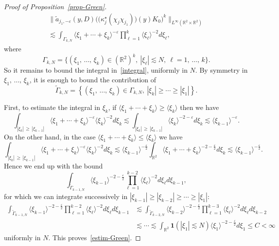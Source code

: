 \documentclass[10pt]{amsart}
\theoremstyle{definition}\newtheorem{defi}[theo]{Definition}\newtheorem{rema}[theo]{Remark}\newtheorem{exam}[theo]{Example}\newtheorem{exem}[theo]{Example}\newtheorem{nota}[theo]{Notation}
\newcommand{\R}{\mathbb{R}}
\newcommand{\ind}{\mathbf{1}}
\newcommand{\eps}{\varepsilon}
\newcommand{\kk}{\kappa}
\newcommand{\wt}{\widetilde}
\newcommand{\les}{\lesssim}
\newcommand{\jb}[1] {\langle #1 \rangle}
\begin{document}
\begin{proof}[Proof of Proposition~\ref{prop-Green}]
\begin{multline}\label{integral}
\Big\|\wt a_{j_1,-\eps}(y,D)\Big(\big(\kk_j^\star(\chi_j\chi_{j_1})\big)(y)K_0\Big)^k\Big\|_{L^{\infty}(\R^2\times\R^2)}\\
\les \int_{\Gamma_{k,N}}\jb{\xi_1+\cdots+\xi_k}^{-\eps}\prod_{\ell=1}^k\jb{\xi_\ell}^{-2}d\xi_\ell,
\end{multline}
where
\begin{equation*}
\Gamma_{k,N}=\big\{(\xi_1,\,\dots,\,\xi_k)\in \left(\R^2\right)^k,~|\xi_\ell|\les N,~\ell=1,\,\dots,\,k\big\}.
\end{equation*}
So it remains to bound the integral in~\eqref{integral}, uniformly in $N$. By symmetry in $\xi_1,\,\dots,\,\xi_k$, it is enough to bound the contribution of
\begin{equation*}
\widetilde{\Gamma}_{k,N}=\left\{(\xi_1,\,\dots,\,\xi_k)\in\Gamma_{k,N},~|\xi_k|\geq \cdots\geq |\xi_1|\right\}.
\end{equation*}

First, to estimate the integral in $\xi_k$, if $\jb{\xi_1+\cdots+\xi_k}\geq \jb{\xi_k}$ then we have
\begin{equation*}
\int_{|\xi_k|\,\geq\,|\xi_{k-1}|}\jb{\xi_1+\cdots+\xi_k}^{-\varepsilon}\jb{\xi_k}^{-2}d\xi_k\les \int_{|\xi_k|\,\geq\,|\xi_{k-1}|}\jb{\xi_k}^{-2-\varepsilon}d\xi_k\les \jb{\xi_{k-1}}^{-\varepsilon}.
\end{equation*}
On the other hand, in the case $\jb{\xi_1+\cdots+\xi_k}\leq \jb{\xi_k}$ we have
\begin{equation*}
\int_{|\xi_k|\,\geq\,|\xi_{k-1}|}\jb{\xi_1+\cdots+\xi_k}^{-\varepsilon}\jb{\xi_k}^{-2}d\xi_k\les \jb{\xi_{k-1}}^{-\frac{\varepsilon}2}\int_{\R^2}\jb{\xi_1+\cdots+\xi_k}^{-2-\frac{\varepsilon}2}d\xi_k\les \jb{\xi_{k-1}}^{-\frac{\varepsilon}2}.
\end{equation*}
Hence we end up with the bound
\begin{equation*}
\int_{\widetilde{\Gamma}_{k-1,N}}\jb{\xi_{k-1}}^{-2-\frac{\varepsilon}2}\prod_{\ell=1}^{k-2}\jb{\xi_\ell}^{-2}d\xi_\ell d\xi_{k-1},
\end{equation*}
for which we can integrate successively in $|\xi_{k-1}|\geq |\xi_{k-2}|\geq \cdots\geq |\xi_1|$:
\begin{align*}
\int_{\widetilde{\Gamma}_{k-1,N}}\jb{\xi_{k-1}}^{-2-\frac{\varepsilon}2}\prod_{\ell=1}^{k-2}\jb{\xi_\ell}^{-2}d\xi_\ell d\xi_{k-1}&\les \int_{\widetilde{\Gamma}_{k-2,N}}\jb{\xi_{k-2}}^{-2-\frac{\varepsilon}2}\prod_{\ell=1}^{k-3}\jb{\xi_\ell}^{-2}d\xi_\ell d\xi_{k-2}\\
&\les \cdots \les \int_{\R^2}\ind(|\xi_1|\les N)\jb{\xi_1}^{-2-\frac\eps2}d\xi_1 \leq C <\infty
\end{align*}
uniformly in $N$. This proves~\eqref{estim-Green}.
\vspace{4pt}


\end{proof}
\end{document}
